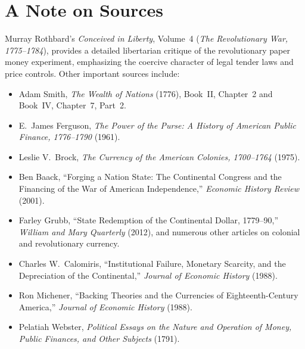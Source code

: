 \documentclass[12pt]{article}
\begin{document}
\section{A Note on Sources}

Murray Rothbard's \emph{Conceived in Liberty}, Volume~4 (\emph{The
Revolutionary War, 1775--1784}), provides a detailed libertarian critique of
the revolutionary paper money experiment, emphasizing the coercive character
of legal tender laws and price controls.  Other important sources include:

\begin{itemize}[nosep]
    \item Adam Smith, \emph{The Wealth of Nations} (1776), Book~II, Chapter~2
          and Book~IV, Chapter~7, Part~2.
    \item E.\ James Ferguson, \emph{The Power of the Purse: A History of
          American Public Finance, 1776--1790} (1961).
    \item Leslie V.\ Brock, \emph{The Currency of the American Colonies,
          1700--1764} (1975).
    \item Ben Baack, ``Forging a Nation State: The Continental Congress and the
          Financing of the War of American Independence,'' \emph{Economic
          History Review} (2001).
    \item Farley Grubb, ``State Redemption of the Continental Dollar,
          1779--90,'' \emph{William and Mary Quarterly} (2012), and numerous
          other articles on colonial and revolutionary currency.
    \item Charles W.\ Calomiris, ``Institutional Failure, Monetary Scarcity,
          and the Depreciation of the Continental,'' \emph{Journal of Economic
          History} (1988).
    \item Ron Michener, ``Backing Theories and the Currencies of
          Eighteenth-Century America,'' \emph{Journal of Economic History}
          (1988).
    \item Pelatiah Webster, \emph{Political Essays on the Nature and Operation
          of Money, Public Finances, and Other Subjects} (1791).
\end{itemize}
\end{document}
